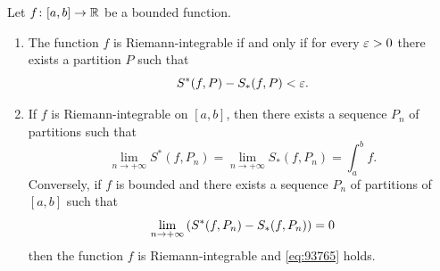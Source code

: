 \begin{theorem}
\label{th:criteri_integrabilita}%
\mymark{*}%
%
%
Let $f\colon[a,b]\to {\mathbb R}$ be a bounded function.
\begin{enumerate}
\item
The function $f$ is Riemann-integrable if and only if
for every $\varepsilon>0$ there exists a partition $P$
such that
\[
  S^*(f,P) - S_*(f,P) < \varepsilon.
\]

\item
If $f$ is Riemann-integrable on $[a,b]$, then
there exists a sequence $P_n$ of partitions such that
\begin{equation}\label{eq:93765}
  \lim_{n\to +\infty} S^*(f,P_n)
  = \lim_{n\to+\infty} S_*(f,P_n)
  = \int_a^b f.
\end{equation}
Conversely, if $f$ is bounded and there exists a sequence $P_n$ 
of partitions of $[a,b]$ such that
\begin{equation*}
  \lim_{n\to +\infty} {\left( S^*(f,P_n) - S_*(f,P_n) \right)} = 0
\end{equation*}
then the function $f$ is Riemann-integrable and \eqref{eq:93765} holds.
\end{enumerate}
\end{theorem}
%
